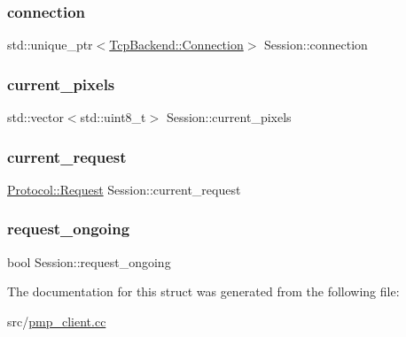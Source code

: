 \subsubsection{\texorpdfstring{connection}{connection}}
{\footnotesize\ttfamily std\+::unique\+\_\+ptr$<$\hyperlink{classTcpBackend_1_1Connection}{Tcp\+Backend\+::\+Connection}$>$ Session\+::connection}

\mbox{\label{structSession_a8000e4b6e8ab34810d9771a8d7bf59e6}} 
\subsubsection{\texorpdfstring{current\+\_\+pixels}{current\_pixels}}
{\footnotesize\ttfamily std\+::vector$<$std\+::uint8\+\_\+t$>$ Session\+::current\+\_\+pixels}

\mbox{\label{structSession_a1358d19f1cfc7e2ac6c2c6ad51ef2f42}} 
\subsubsection{\texorpdfstring{current\+\_\+request}{current\_request}}
{\footnotesize\ttfamily \hyperlink{structProtocol_1_1Request}{Protocol\+::\+Request} Session\+::current\+\_\+request}

\mbox{\label{structSession_a7136254f114d887ab73172b395c040d5}} 
\subsubsection{\texorpdfstring{request\+\_\+ongoing}{request\_ongoing}}
{\footnotesize\ttfamily bool Session\+::request\+\_\+ongoing}



The documentation for this struct was generated from the following file\+:\begin{DoxyCompactItemize}
\item 
src/\hyperlink{pmp__client_8cc}{pmp\+\_\+client.\+cc}\end{DoxyCompactItemize}
